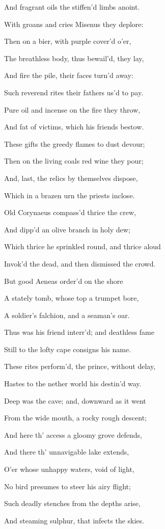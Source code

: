 And fragrant oils the stiffen’d limbs anoint.

With groans and cries Misenus they deplore:

Then on a bier, with purple cover’d o’er,

The breathless body, thus bewail’d, they lay,

And fire the pile, their faces turn’d away:

Such reverend rites their fathers us’d to pay.

Pure oil and incense on the fire they throw,

And fat of victims, which his friends bestow.

These gifts the greedy flames to dust devour;

Then on the living coals red wine they pour;

And, last, the relics by themselves dispose,

Which in a brazen urn the priests inclose.

Old Corynaeus compass’d thrice the crew,

And dipp’d an olive branch in holy dew;

Which thrice he sprinkled round, and thrice aloud

Invok’d the dead, and then dismissed the crowd.

But good Aeneas order’d on the shore

A stately tomb, whose top a trumpet bore,

A soldier’s falchion, and a seaman’s oar.

Thus was his friend interr’d; and deathless fame

Still to the lofty cape consigns his name.

These rites perform’d, the prince, without delay,

Hastes to the nether world his destin’d way.

Deep was the cave; and, downward as it went

From the wide mouth, a rocky rough descent;

And here th’ access a gloomy grove defends,

And there th’ unnavigable lake extends,

O’er whose unhappy waters, void of light,

No bird presumes to steer his airy flight;

Such deadly stenches from the depths arise,

And steaming sulphur, that infects the skies.

